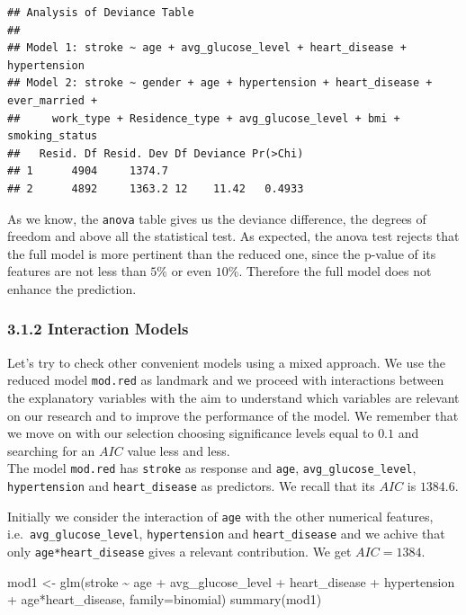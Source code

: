 \documentclass[
]{article}
\newenvironment{Shaded}{\begin{snugshade}}{\end{snugshade}}
\newcommand{\AttributeTok}[1]{\textcolor[rgb]{0.77,0.63,0.00}{#1}}
\newcommand{\FunctionTok}[1]{\textcolor[rgb]{0.00,0.00,0.00}{#1}}
\newcommand{\NormalTok}[1]{#1}
\newcommand{\OtherTok}[1]{\textcolor[rgb]{0.56,0.35,0.01}{#1}}
\newcommand{\SpecialCharTok}[1]{\textcolor[rgb]{0.00,0.00,0.00}{#1}}
\begin{document}
\begin{verbatim}
## Analysis of Deviance Table
## 
## Model 1: stroke ~ age + avg_glucose_level + heart_disease + hypertension
## Model 2: stroke ~ gender + age + hypertension + heart_disease + ever_married + 
##     work_type + Residence_type + avg_glucose_level + bmi + smoking_status
##   Resid. Df Resid. Dev Df Deviance Pr(>Chi)
## 1      4904     1374.7                     
## 2      4892     1363.2 12    11.42   0.4933
\end{verbatim}

As we know, the \texttt{anova} table gives us the deviance difference,
the degrees of freedom and above all the statistical test. As expected,
the anova test rejects that the full model is more pertinent than the
reduced one, since the p-value of its features are not less than \(5\%\)
or even \(10\%\). Therefore the full model does not enhance the
prediction.

\hypertarget{interaction-models}{%
\subsubsection{3.1.2 Interaction Models}\label{interaction-models}}

Let's try to check other convenient models using a mixed approach. We
use the reduced model \texttt{mod.red} as landmark and we proceed with
interactions between the explanatory variables with the aim to
understand which variables are relevant on our research and to improve
the performance of the model. We remember that we move on with our
selection choosing significance levels equal to \(0.1\) and searching
for an \(AIC\) value less and less.\\
The model \texttt{mod.red} has \texttt{stroke} as response and
\texttt{age}, \texttt{avg\_glucose\_level}, \texttt{hypertension} and
\texttt{heart\_disease} as predictors. We recall that its \(AIC\) is
\(1384.6\).

Initially we consider the interaction of \texttt{age} with the other
numerical features, i.e.~\texttt{avg\_glucose\_level},
\texttt{hypertension} and \texttt{heart\_disease} and we achive that
only \texttt{age*heart\_disease} gives a relevant contribution. We get
\(AIC = 1384\).

\begin{Shaded}
\begin{Highlighting}[]
\NormalTok{mod1 }\OtherTok{\textless{}{-}} \FunctionTok{glm}\NormalTok{(stroke }\SpecialCharTok{\textasciitilde{}}\NormalTok{ age }\SpecialCharTok{+}\NormalTok{ avg\_glucose\_level }\SpecialCharTok{+}\NormalTok{ heart\_disease }\SpecialCharTok{+}\NormalTok{ hypertension }\SpecialCharTok{+}
\NormalTok{               age}\SpecialCharTok{*}\NormalTok{heart\_disease, }\AttributeTok{family=}\NormalTok{binomial)}
\FunctionTok{summary}\NormalTok{(mod1)}
\end{Highlighting}
\end{Shaded}
\end{document}
